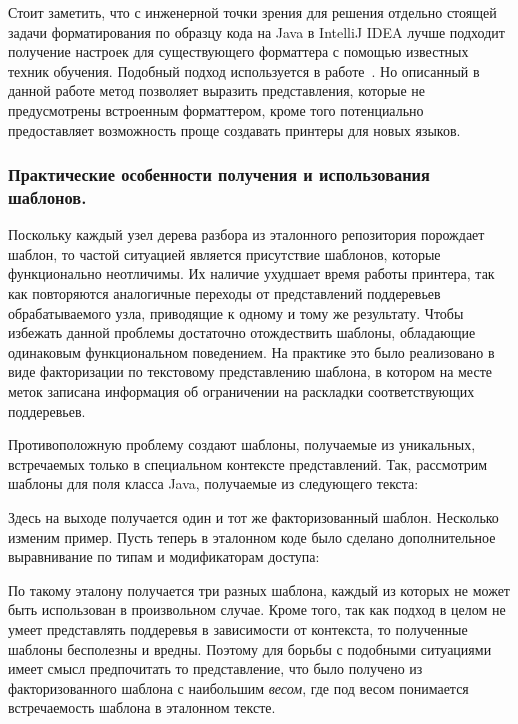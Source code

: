 Стоит заметить, что с инженерной точки зрения для решения отдельно стоящей задачи
форматирования по образцу кода на Java в IntelliJ IDEA лучше подходит
получение настроек для существующего форматтера с помощью известных техник обучения.
Подобный подход используется в работе~\cite{learning}.
Но описанный в данной работе метод позволяет выразить представления, которые не
предусмотрены встроенным форматтером, кроме того потенциально предоставляет
возможность проще создавать принтеры для новых языков. 

\subsubsection{Практические особенности получения и использования шаблонов.}

Поскольку каждый узел дерева разбора из эталонного репозитория порождает
шаблон, то частой ситуацией является присутствие шаблонов, которые функционально
неотличимы. Их наличие ухудшает время работы принтера, так как повторяются
аналогичные переходы от представлений поддеревьев обрабатываемого узла, приводящие
к одному и тому же результату. Чтобы избежать данной проблемы достаточно
отождествить шаблоны, обладающие одинаковым функциональном поведением.
На практике это было реализовано в виде факторизации по текстовому представлению
шаблона, в котором на месте меток записана информация об ограничении на раскладки
соответствующих поддеревьев.

Противоположную проблему создают шаблоны, получаемые из уникальных,
встречаемых только в специальном контексте представлений.
Так, рассмотрим шаблоны для поля класса Java,
получаемые из следующего текста:



Здесь на выходе получается один и тот же факторизованный шаблон.
Несколько изменим пример. Пусть теперь
в эталонном коде было сделано дополнительное выравнивание по типам
и модификаторам доступа:



По такому эталону получается три разных шаблона, каждый из которых не может
быть использован в произвольном случае. Кроме того, так как подход в целом не
умеет представлять поддеревья в зависимости от контекста, то полученные шаблоны
бесполезны и вредны. Поэтому для борьбы с подобными ситуациями имеет смысл
предпочитать то представление, что было получено из факторизованного шаблона с
наибольшим \emph{весом}, где под весом понимается встречаемость шаблона в
эталонном тексте.

